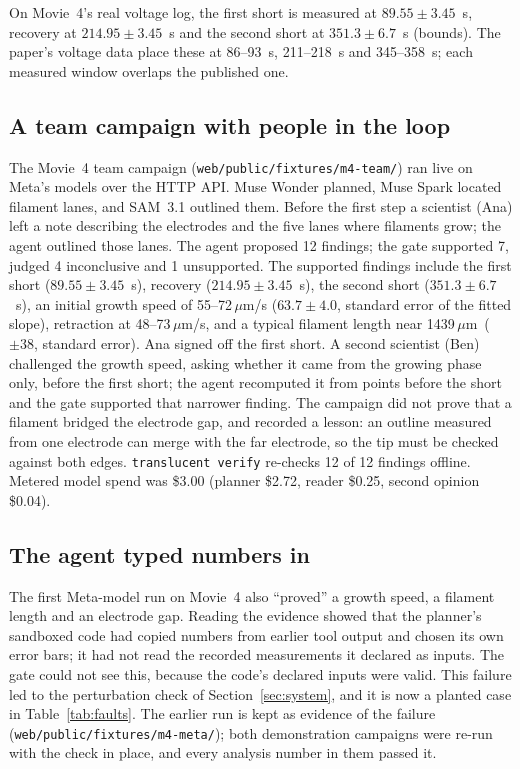 \documentclass[11pt]{article}
\newcommand{\cmd}[1]{\texttt{#1}}
\newcommand{\um}{\,$\mu$m}
\begin{document}
On Movie~4's real voltage log, the first short is measured at $89.55 \pm 3.45$~s, recovery at $214.95 \pm 3.45$~s and
the second short at $351.3 \pm 6.7$~s (bounds). The paper's voltage data place these at 86--93~s, 211--218~s and
345--358~s; each measured window overlaps the published one.

\subsection{A team campaign with people in the loop}
The Movie~4 team campaign (\cmd{web/public/fixtures/m4-team/}) ran live on Meta's models over the HTTP API. Muse
Wonder planned, Muse Spark located filament lanes, and SAM~3.1 outlined them. Before the first step a scientist (Ana)
left a note describing the electrodes and the five lanes where filaments grow; the agent outlined those lanes. The
agent proposed 12 findings; the gate supported 7, judged 4 inconclusive and 1 unsupported. The supported findings
include the first short ($89.55 \pm 3.45$~s), recovery ($214.95 \pm 3.45$~s), the second short ($351.3 \pm 6.7$~s),
an initial growth speed of 55--72\um/s ($63.7 \pm 4.0$, standard error of the fitted slope), retraction at 48--73\um/s, and a typical
filament length near 1439\um\ ($\pm 38$, standard error). Ana signed off the first short. A second scientist (Ben) challenged the
growth speed, asking whether it came from the growing phase only, before the first short; the agent recomputed it
from points before the short and the gate supported that narrower finding. The campaign did not prove that a filament
bridged the electrode gap, and recorded a lesson: an outline measured from one electrode can merge with the far
electrode, so the tip must be checked against both edges. \cmd{translucent verify} re-checks 12 of 12 findings
offline. Metered model spend was \$3.00 (planner \$2.72, reader \$0.25, second opinion \$0.04).

\subsection{The agent typed numbers in}\label{sec:typed}
The first Meta-model run on Movie~4 also ``proved'' a growth speed, a filament length and an electrode gap. Reading
the evidence showed that the planner's sandboxed code had copied numbers from earlier tool output and chosen its own
error bars; it had not read the recorded measurements it declared as inputs. The gate could not see this, because
the code's declared inputs were valid. This failure led to the perturbation check of Section~\ref{sec:system}, and it
is now a planted case in Table~\ref{tab:faults}. The earlier run is kept as evidence of the failure
(\cmd{web/public/fixtures/m4-meta/}); both demonstration campaigns were re-run with the check in place, and every
analysis number in them passed it.
\end{document}
